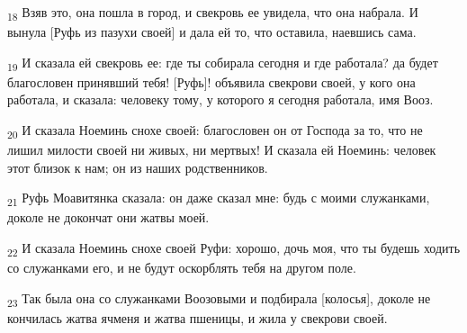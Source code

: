 \begin{tcolorbox}
\textsubscript{18} Взяв это, она пошла в город, и свекровь ее увидела, что она набрала. И вынула [Руфь из пазухи своей] и дала ей то, что оставила, наевшись сама.
\end{tcolorbox}
\begin{tcolorbox}
\textsubscript{19} И сказала ей свекровь ее: где ты собирала сегодня и где работала? да будет благословен принявший тебя! [Руфь]! объявила свекрови своей, у кого она работала, и сказала: человеку тому, у которого я сегодня работала, имя Вооз.
\end{tcolorbox}
\begin{tcolorbox}
\textsubscript{20} И сказала Ноеминь снохе своей: благословен он от Господа за то, что не лишил милости своей ни живых, ни мертвых! И сказала ей Ноеминь: человек этот близок к нам; он из наших родственников.
\end{tcolorbox}
\begin{tcolorbox}
\textsubscript{21} Руфь Моавитянка сказала: он даже сказал мне: будь с моими служанками, доколе не докончат они жатвы моей.
\end{tcolorbox}
\begin{tcolorbox}
\textsubscript{22} И сказала Ноеминь снохе своей Руфи: хорошо, дочь моя, что ты будешь ходить со служанками его, и не будут оскорблять тебя на другом поле.
\end{tcolorbox}
\begin{tcolorbox}
\textsubscript{23} Так была она со служанками Воозовыми и подбирала [колосья], доколе не кончилась жатва ячменя и жатва пшеницы, и жила у свекрови своей.
\end{tcolorbox}
